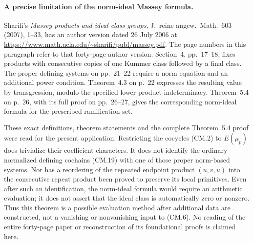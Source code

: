 \paragraph{A precise limitation of the norm-ideal Massey formula.}
Sharifi's \emph{Massey products and ideal class groups},
J.~reine angew.~Math.~603 (2007), 1--33, has an author
version dated 26 July 2006 at
\url{https://www.math.ucla.edu/~sharifi/publ/massey.pdf}.
The page numbers in this paragraph refer to that forty-page
author version.  Section~4, pp.~17--18, fixes products with
consecutive copies of one Kummer class followed by a final
class.  The proper defining systems on pp.~21--22 require
a norm equation and an additional power condition.
Theorem~4.3 on p.~22 expresses the resulting value by
transgression, modulo the specified lower-product
indeterminacy.  Theorem~5.4 on p.~26, with its full proof
on pp.~26--27, gives the corresponding norm-ideal formula
for the prescribed ramification set.

These exact definitions, theorem statements and the complete
Theorem~5.4 proof were read for the present application.
Restricting the cocycles (CM.2) to $E(\mu_p)$ does trivialize
their coefficient characters.  It does not identify the
ordinary-normalized defining cochains (CM.19) with one of
those proper norm-based systems.  Nor has a reordering of
the repeated endpoint product $(u,v,u)$ into the consecutive
repeat product been proved to preserve its local primitives.
Even after such an identification, the norm-ideal formula
would require an arithmetic evaluation; it does not assert
that the ideal class is automatically zero or nonzero.
Thus this theorem is a possible evaluation method after
additional data are constructed, not a vanishing or
nonvanishing input to (CM.6).  No reading of the entire
forty-page paper or reconstruction of its foundational
proofs is claimed here.
